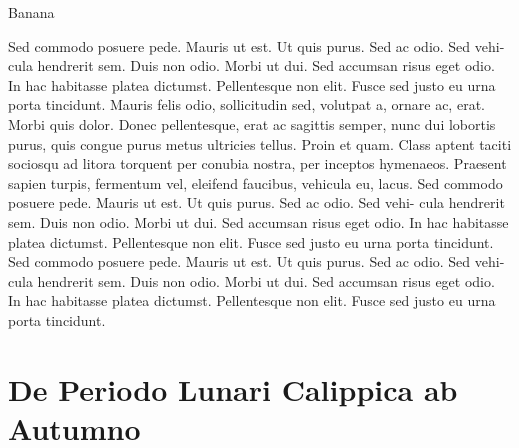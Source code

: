\documentclass[12pt,twoside,a4paper]{book}
\begin{document}
%
%  

Banana

\the\bigskipamount

\the\LTpre

\the\LTpre


\clearpage
\lipsum

Sed commodo posuere pede. Mauris ut est. Ut quis purus. Sed ac odio.
Sed vehi- cula hendrerit sem. Duis non odio. Morbi ut dui.
Sed accumsan risus eget odio. In hac habitasse platea dictumst.
Pellentesque non elit. Fusce sed justo eu urna porta tincidunt.
Mauris felis odio, sollicitudin sed, volutpat a, ornare ac, erat.
Morbi quis dolor. Donec pellentesque, erat ac sagittis semper,
nunc dui lobortis purus, quis congue purus metus ultricies tellus.
Proin et quam. Class aptent taciti sociosqu ad litora torquent per
conubia nostra, per inceptos hymenaeos.
Praesent sapien turpis, fermentum vel, eleifend faucibus, vehicula eu,
lacus.
Sed commodo posuere pede. Mauris ut est. Ut quis purus. Sed ac odio.
Sed vehi- cula hendrerit sem. Duis non odio. Morbi ut dui.
Sed accumsan risus eget odio. In hac habitasse platea dictumst.
Pellentesque non elit. Fusce sed justo eu urna porta tincidunt.
Sed commodo posuere pede. Mauris ut est. Ut quis purus. Sed ac odio.
Sed vehi- cula hendrerit sem. Duis non odio. Morbi ut dui.
Sed accumsan risus eget odio. In hac habitasse platea dictumst.
Pellentesque non elit. Fusce sed justo eu urna porta tincidunt.

\smallskip


\section{De Periodo Lunari Calippica ab Autumno}

\lipsum

\lipsum[150]

\listoftables
\end{document}
